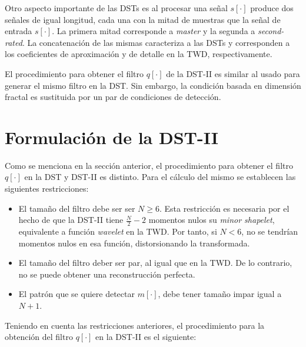 Otro aspecto importante de las DSTs es al procesar una señal $s[\cdot]$ produce dos 
señales de igual longitud, cada una con la mitad de muestras que la señal de entrada $s[\cdot]$. La primera 
mitad corresponde a \textit{master} y la segunda a \textit{second-rated}. 
La concatenación de las mismas caracteriza a las DSTs
y corresponden a los coeficientes de aproximación y de detalle en la TWD, respectivamente.

El procedimiento para obtener el filtro $q[\cdot]$ de la DST-II es similar al usado para generar el mismo filtro
en la DST. Sin embargo, la condición basada en dimensión fractal es sustituida por un par de condiciones
de detección.


\section{Formulación de la DST-II}\label{algoritmo:dst-2}

Como se menciona en la sección anterior, el procedimiento para obtener el filtro $q[\cdot]$ en la DST y DST-II
es distinto. Para el cálculo del mismo se establecen las siguientes restricciones:

\begin{itemize}
	\item El tamaño del filtro debe ser ser $N \geq 6$. Esta restricción es necesaria por el hecho de que la 
		DST-II tiene $\frac{N}{2}-2$  momentos nulos su \textit{minor shapelet}, equivalente a función \textit{wavelet}
		en la TWD. Por tanto, si $N<6$, no se tendrían momentos nulos en esa función, distorsionando la transformada.
	\item El tamaño del filtro deber ser par, al igual que en la TWD. De lo contrario, no se puede obtener una 
		reconstrucción perfecta.
	\item El patrón que se quiere detectar $m[\cdot]$, debe tener tamaño impar igual a $N+1$.
\end{itemize}

Teniendo en cuenta las restricciones anteriores, el procedimiento para la obtención del filtro $q[\cdot]$ en la DST-II 
es el siguiente:

